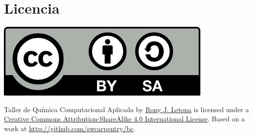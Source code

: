 \documentclass[10pt,letterpaper]{article}
\begin{document}
\section*{Licencia}

\noindent \includegraphics{img/cc_big.png}

\noindent Taller de Qu\'imica Computacional Aplicada by \href{http://github.com/zronyj/TQCA}{Rony J. Letona} is licensed under a \href{http://creativecommons.org/licenses/by-sa/4.0/}{Creative Commons Attribution-ShareAlike 4.0 International License}.
Based on a work at \url{http://github.com/swcarpentry/bc}.
\end{document}
